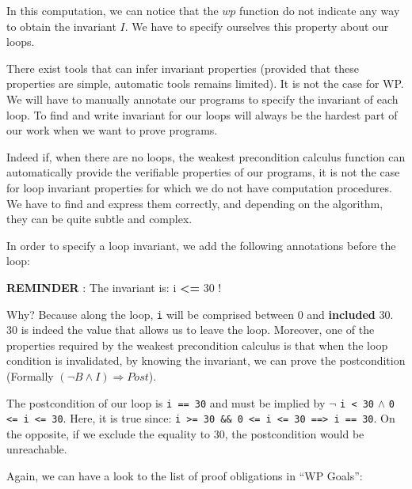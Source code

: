 In this computation, we can notice that the $wp$ function do not
indicate any way to obtain the invariant $I$. We have to specify
ourselves this property about our loops.





There exist tools that can infer invariant properties (provided that
these properties are simple, automatic tools remains limited). It is not
the case for WP. We will have to manually annotate our programs to
specify the invariant of each loop. To find and write invariant for our
loops will always be the hardest part of our work when we want to prove
programs.



Indeed if, when there are no loops, the weakest precondition calculus
function can automatically provide the verifiable properties of our
programs, it is not the case for loop invariant properties for which we
do not have computation procedures. We have to find and express them
correctly, and depending on the algorithm, they can be quite subtle and
complex.



In order to specify a loop invariant, we add the following annotations
before the loop:






\begin{Warning}
  \textbf{REMINDER} : The invariant is: i \textbf{<=} 30 !
\end{Warning}


Why? Because along the loop, \texttt{i} will be comprised between 0 and
\textbf{included} 30. 30 is indeed the value that allows us to leave the
loop. Moreover, one of the properties required by the weakest
precondition calculus is that when the loop condition is invalidated, by
knowing the invariant, we can prove the postcondition (Formally
$(\neg B \wedge I) \Rightarrow Post$).

The postcondition of our loop is \texttt{i == 30} and must be implied
by $\neg$ \texttt{i < 30} $\wedge$
\texttt{0 <= i <= 30}. Here, it is true since:
\texttt{i >= 30 \&\& 0 <= i <= 30 ==> i == 30}.
On the opposite, if we exclude the equality to 30, the postcondition
would be unreachable.



Again, we can have a look to the list of proof obligations in ``WP
Goals'':



